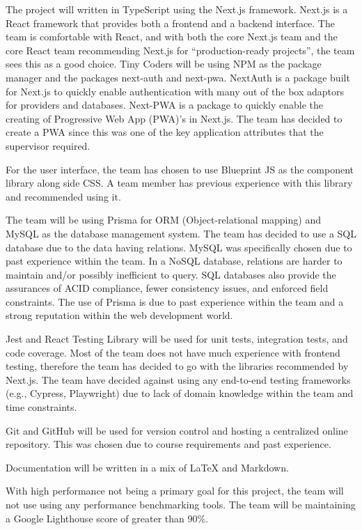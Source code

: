 \documentclass{article}
\begin{document}
The project will written in TypeScript using the Next.js framework. Next.js is a React framework
that provides both a frontend and a backend interface. The team is comfortable with React, and with
both the core Next.js team and the core React team recommending Next.js for ``production-ready
projects'', the team sees this as a good choice. Tiny Coders will be using NPM as the package
manager and the packages next-auth and next-pwa. NextAuth is a package built for Next.js to quickly
enable authentication with many out of the box adaptors for providers and databases. Next-PWA is a
package to quickly enable the creating of Progressive Web App (PWA)'s in Next.js. The team has
decided to create a PWA since this was one of the key application attributes that the supervisor
required.

For the user interface, the team has chosen to use Blueprint JS as the component library along side
CSS. A team member has previous experience with this library and recommended using it.

The team will be using Prisma for ORM (Object-relational mapping) and MySQL as the database
management system. The team has decided to use a SQL database due to the data having relations.
MySQL was specifically chosen due to past experience within the team. In a NoSQL database,
relations are harder to maintain and/or possibly inefficient to query. SQL databases also provide
the assurances of ACID compliance, fewer consistency issues, and enforced field constraints. The
use of Prisma is due to past experience within the team and a strong reputation within the web
development world.

Jest and React Testing Library will be used for unit tests, integration tests, and code coverage.
Most of the team does not have much experience with frontend testing, therefore the team has
decided to go with the libraries recommended by Next.js. The team have decided against using any
end-to-end testing frameworks (e.g., Cypress, Playwright) due to lack of domain knowledge within
the team and time constraints.

Git and GitHub will be used for version control and hosting a centralized online repository. This
was chosen due to course requirements and past experience.

Documentation will be written in a mix of \LaTeX{} and Markdown.

With high performance not being a primary goal for this project, the team will not use using any
performance benchmarking tools. The team will be maintaining a Google Lighthouse score of greater
than 90\%.
\end{document}
